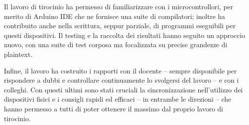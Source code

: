 \documentclass[a4paper, 12pt, italian]{extarticle}
\begin{document}
Il lavoro di tirocinio ha permesso di familiarizzare con i microcontrollori, per merito di Arduino IDE che ne fornisce una suite di compilatori; inoltre ha contribuito anche nella scrittura, seppur parziale, di programmi eseguibili per questi dispositivi. Il testing e la raccolta dei risultati hanno seguito un approccio nuovo, con una suite di test corposa ma focalizzata su precise grandezze di plaintext.

Infine, il lavoro ha costruito i rapporti con il docente -- sempre disponibile per rispondere a dubbi e controllare continuamente lo svolgersi del lavoro -- e con i colleghi. Con questi ultimi sono stati cruciali la sincronizzazione nell'utilizzo dei dispositivi fisici e i consigli rapidi ed efficaci -- in entrambe le direzioni -- che hanno permesso a tutti di poter ottenere il massimo dal proprio lavoro di tirocinio.

\newpage

\section{\bibname}

\nocite{*}
\printbibliography[heading=none]
\end{document}
